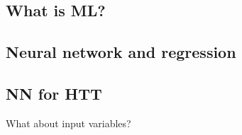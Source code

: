 \subsection*{What is ML?}


\subsection*{Neural network and regression}






\subsection*{NN for HTT}

\begin{frame}
\end{frame}



\begin{frame}
\begin{center}
\large What about input variables?
\end{center}
\end{frame}






